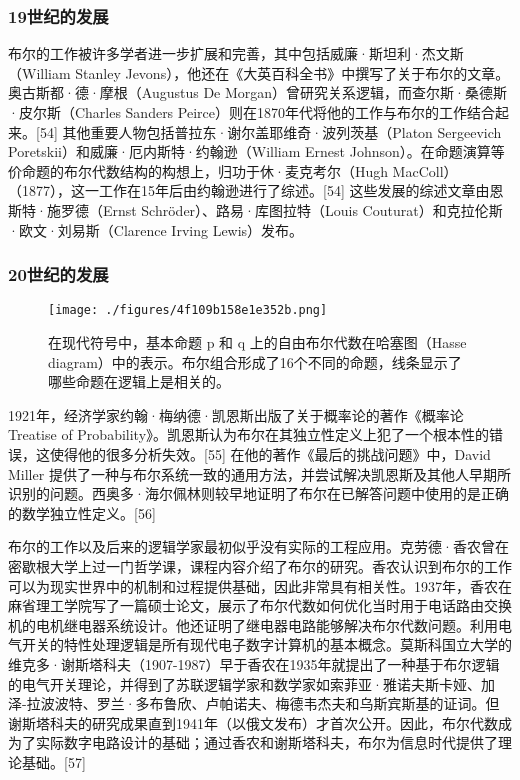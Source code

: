 \subsubsection{19世纪的发展}  
布尔的工作被许多学者进一步扩展和完善，其中包括威廉·斯坦利·杰文斯（William Stanley Jevons），他还在《大英百科全书》中撰写了关于布尔的文章。奥古斯都·德·摩根（Augustus De Morgan）曾研究关系逻辑，而查尔斯·桑德斯·皮尔斯（Charles Sanders Peirce）则在1870年代将他的工作与布尔的工作结合起来。[54] 其他重要人物包括普拉东·谢尔盖耶维奇·波列茨基（Platon Sergeevich Poretskii）和威廉·厄内斯特·约翰逊（William Ernest Johnson）。在命题演算等价命题的布尔代数结构的构想上，归功于休·麦克考尔（Hugh MacColl）（1877），这一工作在15年后由约翰逊进行了综述。[54] 这些发展的综述文章由恩斯特·施罗德（Ernst Schröder）、路易·库图拉特（Louis Couturat）和克拉伦斯·欧文·刘易斯（Clarence Irving Lewis）发布。
\subsubsection{20世纪的发展} 
\begin{figure}[ht]
\centering
\texttt{[image: ./figures/4f109b158e1e352b.png]}
\caption{在现代符号中，基本命题 p 和 q 上的自由布尔代数在哈塞图（Hasse diagram）中的表示。布尔组合形成了16个不同的命题，线条显示了哪些命题在逻辑上是相关的。} \label{fig_George_10}
\end{figure}
1921年，经济学家约翰·梅纳德·凯恩斯出版了关于概率论的著作《概率论Treatise of Probability》。凯恩斯认为布尔在其独立性定义上犯了一个根本性的错误，这使得他的很多分析失效。[55] 在他的著作《最后的挑战问题》中，David Miller 提供了一种与布尔系统一致的通用方法，并尝试解决凯恩斯及其他人早期所识别的问题。西奥多·海尔佩林则较早地证明了布尔在已解答问题中使用的是正确的数学独立性定义。[56]

布尔的工作以及后来的逻辑学家最初似乎没有实际的工程应用。克劳德·香农曾在密歇根大学上过一门哲学课，课程内容介绍了布尔的研究。香农认识到布尔的工作可以为现实世界中的机制和过程提供基础，因此非常具有相关性。1937年，香农在麻省理工学院写了一篇硕士论文，展示了布尔代数如何优化当时用于电话路由交换机的电机继电器系统设计。他还证明了继电器电路能够解决布尔代数问题。利用电气开关的特性处理逻辑是所有现代电子数字计算机的基本概念。莫斯科国立大学的维克多·谢斯塔科夫（1907-1987）早于香农在1935年就提出了一种基于布尔逻辑的电气开关理论，并得到了苏联逻辑学家和数学家如索菲亚·雅诺夫斯卡娅、加泽-拉波波特、罗兰·多布鲁欣、卢帕诺夫、梅德韦杰夫和乌斯宾斯基的证词。但谢斯塔科夫的研究成果直到1941年（以俄文发布）才首次公开。因此，布尔代数成为了实际数字电路设计的基础；通过香农和谢斯塔科夫，布尔为信息时代提供了理论基础。[57]
